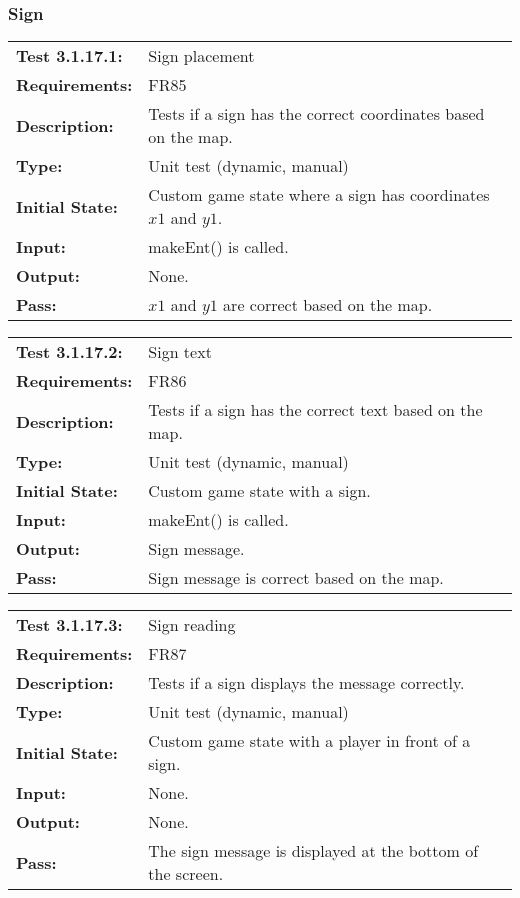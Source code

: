 \documentclass[12pt, titlepage]{article}
\begin{document}
\subsubsection{Sign}

\begin{tabular}{|l|p{10cm}|}
    \hline
    \bf{Test} 3.1.17.1: & Sign placement \\
    \bf{Requirements}: & FR85 \\
    \bf{Description}: & Tests if a sign has the correct coordinates based on the map. \\
    \bf{Type}: & Unit test (dynamic, manual) \\
    \bf{Initial State}: & Custom game state where a sign has coordinates $x1$ and $y1$. \\
    \bf{Input}: & makeEnt() is called. \\
    \bf{Output}: & None. \\
    \bf{Pass}: & $x1$ and $y1$ are correct based on the map. \\
    \hline
\end{tabular}

\begin{tabular}{|l|p{10cm}|}
    \hline
    \bf{Test} 3.1.17.2: & Sign text \\
    \bf{Requirements}: & FR86 \\
    \bf{Description}: & Tests if a sign has the correct text based on the map. \\
    \bf{Type}: & Unit test (dynamic, manual) \\
    \bf{Initial State}: & Custom game state with a sign. \\
    \bf{Input}: & makeEnt() is called. \\
    \bf{Output}: & Sign message. \\
    \bf{Pass}: & Sign message is correct based on the map. \\
    \hline
\end{tabular}

\begin{tabular}{|l|p{10cm}|}
    \hline
    \bf{Test} 3.1.17.3: & Sign reading \\
    \bf{Requirements}: & FR87 \\
    \bf{Description}: & Tests if a sign displays the message correctly. \\
    \bf{Type}: & Unit test (dynamic, manual) \\
    \bf{Initial State}: & Custom game state with a player in front of a sign. \\
    \bf{Input}: & None. \\
    \bf{Output}: & None. \\
    \bf{Pass}: & The sign message is displayed at the bottom of the screen. \\
    \hline
\end{tabular}
\end{document}
